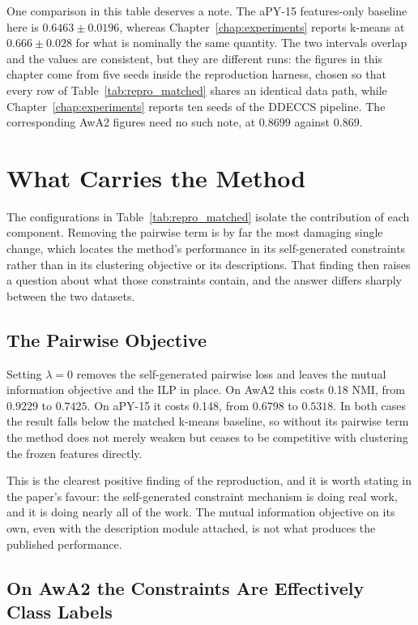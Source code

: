 One comparison in this table deserves a note. The aPY-15 features-only baseline here is $0.6463 \pm 0.0196$, whereas Chapter~\ref{chap:experiments} reports k-means at $0.666 \pm 0.028$ for what is nominally the same quantity. The two intervals overlap and the values are consistent, but they are different runs: the figures in this chapter come from five seeds inside the reproduction harness, chosen so that every row of Table~\ref{tab:repro_matched} shares an identical data path, while Chapter~\ref{chap:experiments} reports ten seeds of the DDECCS pipeline. The corresponding AwA2 figures need no such note, at $0.8699$ against $0.869$.

\section{What Carries the Method}
\label{sec:repro_mechanism}

The configurations in Table~\ref{tab:repro_matched} isolate the contribution of each component. Removing the pairwise term is by far the most damaging single change, which locates the method's performance in its self-generated constraints rather than in its clustering objective or its descriptions. That finding then raises a question about what those constraints contain, and the answer differs sharply between the two datasets.

\subsection{The Pairwise Objective}
\label{subsec:repro_pairwise}

Setting $\lambda = 0$ removes the self-generated pairwise loss and leaves the mutual information objective and the ILP in place. On AwA2 this costs 0.18 NMI, from $0.9229$ to $0.7425$. On aPY-15 it costs 0.148, from $0.6798$ to $0.5318$. In both cases the result falls below the matched k-means baseline, so without its pairwise term the method does not merely weaken but ceases to be competitive with clustering the frozen features directly.

This is the clearest positive finding of the reproduction, and it is worth stating in the paper's favour: the self-generated constraint mechanism is doing real work, and it is doing nearly all of the work. The mutual information objective on its own, even with the description module attached, is not what produces the published performance.

\subsection{On AwA2 the Constraints Are Effectively Class Labels}
\label{subsec:repro_classlabels}

